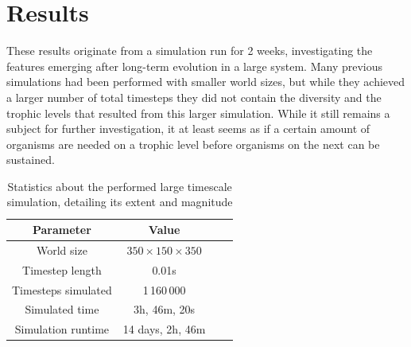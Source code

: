 
\chapter{Results}\label{cpt:Results}

These results originate from a simulation run for 2 weeks, investigating the features emerging after long-term evolution in a large system. Many previous simulations had been performed with smaller world sizes, but while they achieved a larger number of total timesteps they did not contain the diversity and the trophic levels that resulted from this larger simulation. While it still remains a subject for further investigation, it at least seems as if a certain amount of organisms are needed on a trophic level before organisms on the next can be sustained.

\begin{table}[H]
 \begin{tabular}{| c || c | c | c|} 
    \hline
     Parameter &  Value \\ [0.5ex] 
     \hline\hline
     World size & \(350 \times 150 \times 350\) \\ \hline
     Timestep length & 0.01s \\ \hline
     Timesteps simulated & 1\,160\,000 \\ \hline
     Simulated time & 3h, 46m, 20s \\ \hline
     Simulation runtime & 14 days, 2h, 46m \\ \hline
 \end{tabular}
\caption{Statistics about the performed large timescale simulation, detailing its extent and magnitude}
\label{tab:longRunParameters}
\end{table}

